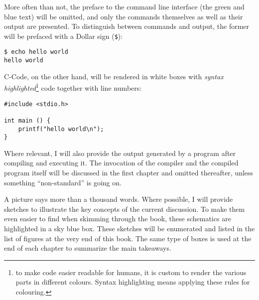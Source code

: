 More often than not, the preface to the command line interface (the green and blue text) will be omitted, and only the commands themselves as well as their output are presented. To distinguish between commands and output, the former will be prefaced with a Dollar sign (\texttt{\$}):

\begin{cmdbox}
\texttt{\$ echo hello world} \\
\texttt{hello world}
\end{cmdbox}

C-Code, on the other hand, will be rendered in white boxes with \emph{syntax highlighted}\footnote{to make code easier readable for humans, it is custom to render the various parts in different colours. Syntax highlighting means applying these rules for colouring.} code together with line numbers:
\begin{codebox}[helloworld.c]
\begin{verbatim}
#include <stdio.h>

int main () {
    printf("hello world\n");
}
\end{verbatim}
\end{codebox}

Where relevant, I will also provide the output generated by a program after compiling and executing it. The invocation of the compiler and the compiled program itself will be discussed in the first chapter and omitted thereafter, unless something \enquote{non-standard} is going on.

A picture says more than a thousand words. Where possible, I will provide sketches to illustrate the key concepts of the current discussion. To make them even easier to find when skimming through the book, these schematics are highlighted in a sky blue box. These sketches will be enumerated and listed in the list of figures at the very end of this book. The same type of boxes is used at the end of each chapter to summarize the main takeaways.

\begin{defbox}[Success]
\begin{center}
\end{center}
\end{defbox}

